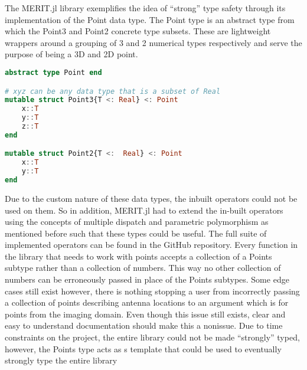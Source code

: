 The MERIT.jl library exemplifies the idea of ``strong'' type safety through its implementation of the Point data type.
The Point type is an abstract type from which the Point3 and Point2 concrete type subsets. These are lightweight
wrappers around a grouping of 3 and 2 numerical types respectively and serve the purpose of being a 3D and 2D point.
\begin{lstlisting}[language=Julia]
abstract type Point end

# xyz can be any data type that is a subset of Real
mutable struct Point3{T <: Real} <: Point
    x::T
    y::T
    z::T 
end

mutable struct Point2{T <:  Real} <: Point
    x::T
    y::T
end
\end{lstlisting}
Due to the custom nature of these data types, the inbuilt operators could not be used on them. So in addition, MERIT.jl
had to extend the in-built operators using the concepts of multiple dispatch and parametric polymorphism as mentioned
before such that these types could be useful. The full suite of implemented operators can be found in the GitHub
repository. Every function in the library that needs to work with points accepts a collection of a Points subtype
rather than a collection of numbers. This way no other collection of numbers can be erroneously passed in place of the
Points subtypes. Some edge cases still exist however, there is nothing stopping a user from incorrectly passing a
collection of points describing antenna locations to an argument which is for points from the imaging domain. Even
though this issue still exists, clear and easy to understand documentation should make this a nonissue. Due to time
constraints on the project, the entire library could not be made ``strongly'' typed, however, the Points type acts as s
template that could be used to eventually strongly type the entire library

